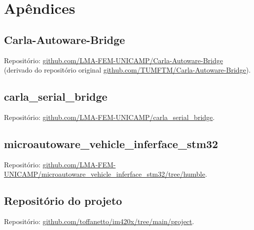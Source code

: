 \thispagestyle{plain}
\section*{Apêndices}

\subsection*{Carla-Autoware-Bridge}

Repositório: \url{github.com/LMA-FEM-UNICAMP/Carla-Autoware-Bridge} (derivado do repositório original \url{github.com/TUMFTM/Carla-Autoware-Bridge}).

\subsection*{carla\_serial\_bridge}

Repositório: \url{github.com/LMA-FEM-UNICAMP/carla_serial_bridge}.

\subsection*{microautoware\_vehicle\_inferface\_stm32}

Repositório: \url{github.com/LMA-FEM-UNICAMP/microautoware_vehicle_inferface_stm32/tree/humble}.

\subsection*{Repositório do projeto}

Repositório: \url{github.com/toffanetto/im420x/tree/main/project}.
